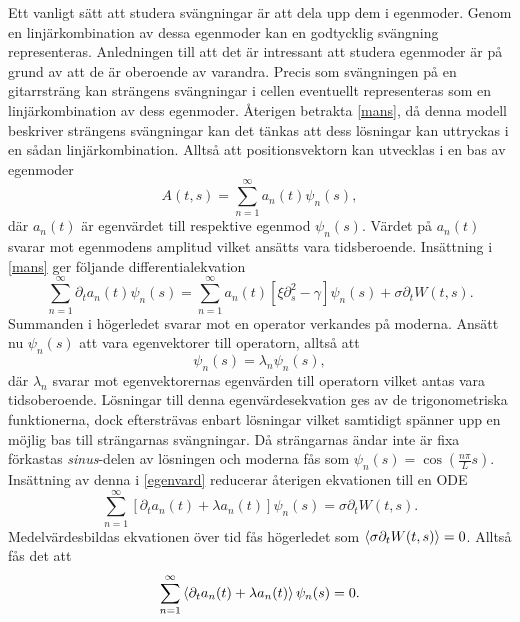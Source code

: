 Ett vanligt sätt att studera svängningar är att dela upp dem i egenmoder. Genom en linjärkombination av dessa egenmoder kan en godtycklig svängning representeras. Anledningen till att det är intressant att studera egenmoder är på grund av att de är oberoende av varandra. Precis som svängningen på en gitarrsträng kan strängens svängningar i cellen eventuellt representeras som en linjärkombination av dess egenmoder. 
Återigen betrakta \eqref{mans}, då denna modell beskriver strängens svängningar kan det tänkas att dess lösningar kan uttryckas i en sådan linjärkombination. Alltså att positionsvektorn kan utvecklas i en bas av egenmoder
\begin{equation}
    A(t,s)=\sum_{n=1}^{\infty}a_{n}(t)\psi_{n}(s),
\end{equation}
där $a_{n}(t)$ är egenvärdet till respektive egenmod $\psi_{n}(s)$. Värdet på $a_{n}(t)$ svarar mot egenmodens amplitud vilket ansätts vara tidsberoende. Insättning i \eqref{mans} ger följande differentialekvation
\begin{equation}\label{egenvard}
    \sum_{n=1}^{\infty}\partial_{t}a_{n}(t)\psi_{n}(s)=\sum_{n=1}^{\infty}a_{n}(t)[\xi\partial_{s}^{2}-\gamma]\psi_{n}(s)+\sigma\partial_{t}W(t,s).
\end{equation}
Summanden i högerledet svarar mot en operator verkandes på moderna. Ansätt nu $\psi_{n}(s)$ att vara egenvektorer till operatorn, alltså att
\begin{equation}
    [\xi\partial_{s}^{2}-\gamma]\psi_{n}(s)=\lambda_{n}\psi_{n}(s),
\end{equation}
där $\lambda_{n}$ svarar mot egenvektorernas egenvärden till operatorn vilket antas vara tidsoberoende. Lösningar till denna egenvärdesekvation ges av de trigonometriska funktionerna, dock eftersträvas enbart lösningar vilket samtidigt spänner upp en möjlig bas till strängarnas svängningar. Då strängarnas ändar inte är fixa förkastas \emph{sinus}-delen av lösningen och moderna fås som \cite{PhysRevE.60.4671} $\psi_{n}(s)=\cos({\frac{n\pi}{L}s})$. Insättning av denna i \eqref{egenvard} reducerar återigen ekvationen till en ODE 
\begin{equation}
    \sum_{n=1}^{\infty}[\partial_{t}a_{n}(t)+\lambda a_{n}(t)]\psi_{n}(s)=\sigma\partial_{t}W(t,s).
\end{equation}
Medelvärdesbildas ekvationen över tid fås högerledet som $\ev{\sigma\partial_{t}W(t,s)}=0$. Alltså fås det att
\begin{equation}
    \sum_{n=1}^{\infty}\ev{\partial_{t}a_{n}(t)+\lambda a_{n}(t)}\psi_{n}(s)=0.
\end{equation}
